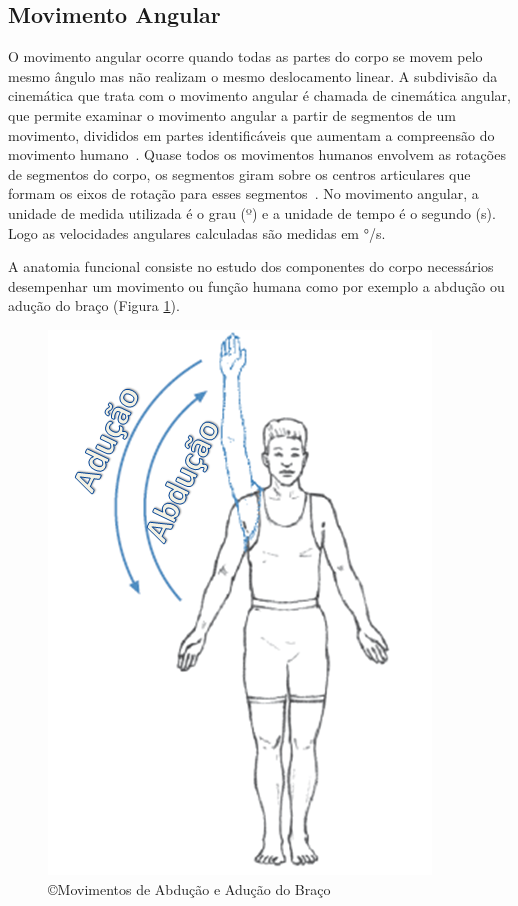 
\subsection{Movimento Angular}
O movimento angular ocorre quando todas as partes do corpo se movem pelo mesmo ângulo mas não realizam o mesmo deslocamento linear. A subdivisão da cinemática que trata com o movimento angular é chamada de cinemática angular, que permite examinar o movimento angular a partir de segmentos de um movimento, divididos em partes identificáveis que aumentam a compreensão do movimento humano~\cite{hamill1999bases}. Quase todos os movimentos humanos envolvem as rotações de segmentos do corpo, os segmentos giram sobre os centros articulares que formam os eixos de rotação para esses segmentos~\cite{hamill1999bases}. No movimento angular, a unidade de medida utilizada é o grau (º) e a unidade de tempo é o segundo (s). Logo as velocidades angulares calculadas são medidas em °/s.

A anatomia funcional consiste no estudo dos componentes do corpo necessários desempenhar um movimento ou função humana como por exemplo a abdução ou adução do braço (Figura \ref{fig:movabducaoaducao}).

\begin{figure}
 \centering
 \includegraphics[scale=0.5]{./img/abducao.png}
\caption[Movimentos de Abdução e Adução do Braço]{\copyright Movimentos de Abdução e Adução do Braço~\cite{mcginnis2013biomechanics}}
 \label{fig:movabducaoaducao}
\end{figure}

